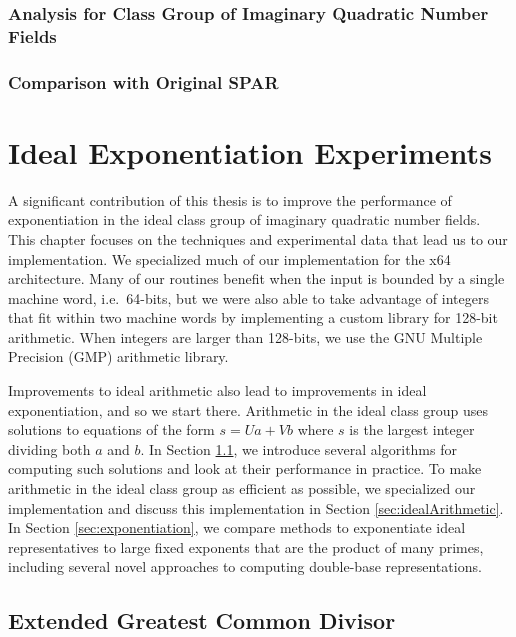 \documentclass{ucalgthes1}
\theoremstyle{definition}
\begin{document}
\subsection{Analysis for Class Group of Imaginary Quadratic Number Fields}
\subsection{Comparison with Original SPAR}


\chapter{Ideal Exponentiation Experiments}
\label{chap:idealPowExperiments}

A significant contribution of this thesis is to improve the performance of exponentiation in the ideal class group of imaginary quadratic number fields.  This chapter focuses on the techniques and experimental data that lead us to our implementation.  We specialized much of our implementation for the x64 architecture.  Many of our routines benefit when the input is bounded by a single machine word, i.e.\ 64-bits, but we were also able to take advantage of integers that fit within two machine words by implementing a custom library for 128-bit arithmetic.  When integers are larger than 128-bits, we use the GNU Multiple Precision (GMP) arithmetic library.

Improvements to ideal arithmetic also lead to improvements in ideal exponentiation, and so we start there. Arithmetic in the ideal class group uses solutions to equations of the form $s = Ua + Vb$ where $s$ is the largest integer dividing both $a$ and $b$. In Section \ref{sec:eea}, we introduce several algorithms for computing such solutions and look at their performance in practice. To make arithmetic in the ideal class group as efficient as possible, we specialized our implementation and discuss this implementation in Section \ref{sec:idealArithmetic}. In Section \ref{sec:exponentiation}, we compare methods to exponentiate ideal representatives to large fixed exponents that are the product of many primes, including several novel approaches to computing double-base representations.

\section{Extended Greatest Common Divisor}
\label{sec:eea}
\end{document}
